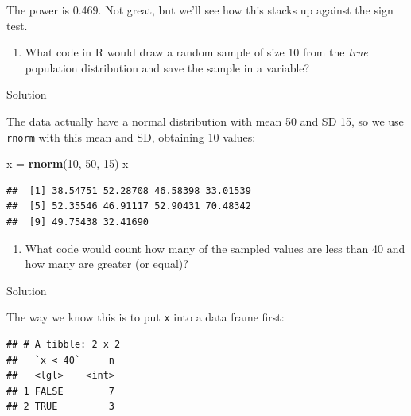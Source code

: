 \documentclass[]{tufte-book}
\newenvironment{Shaded}{}{}
\newcommand{\DecValTok}[1]{\textcolor[rgb]{0.25,0.63,0.44}{#1}}
\newcommand{\KeywordTok}[1]{\textcolor[rgb]{0.00,0.44,0.13}{\textbf{#1}}}
\newcommand{\NormalTok}[1]{#1}
\newcommand{\OperatorTok}[1]{\textcolor[rgb]{0.40,0.40,0.40}{#1}}
\newcommand{\StringTok}[1]{\textcolor[rgb]{0.25,0.44,0.63}{#1}}
\providecommand{\tightlist}{%
  \setlength{\itemsep}{0pt}\setlength{\parskip}{0pt}}
\theoremstyle{definition}
\theoremstyle{definition}
\theoremstyle{definition}
\theoremstyle{remark}
\begin{document}
The power is 0.469. Not great, but we'll see how this stacks up against
the sign test.

\begin{enumerate}
\def\labelenumi{(\alph{enumi})}
\setcounter{enumi}{1}
\tightlist
\item
  What code in R would draw a random sample of size 10 from the
  \emph{true} population distribution and save the sample in a variable?
\end{enumerate}

Solution

The data actually have a normal distribution with mean 50 and SD 15, so
we use \texttt{rnorm} with this mean and SD, obtaining 10 values:

\begin{Shaded}
\begin{Highlighting}[]
\NormalTok{x =}\StringTok{ }\KeywordTok{rnorm}\NormalTok{(}\DecValTok{10}\NormalTok{, }\DecValTok{50}\NormalTok{, }\DecValTok{15}\NormalTok{)}
\NormalTok{x}
\end{Highlighting}
\end{Shaded}

\begin{verbatim}
##  [1] 38.54751 52.28708 46.58398 33.01539
##  [5] 52.35546 46.91117 52.90431 70.48342
##  [9] 49.75438 32.41690
\end{verbatim}

\begin{enumerate}
\def\labelenumi{(\alph{enumi})}
\setcounter{enumi}{2}
\tightlist
\item
  What code would count how many of the sampled values are less than 40
  and how many are greater (or equal)?
\end{enumerate}

Solution

The way we know this is to put \texttt{x} into a data frame first:

\begin{Shaded}
\end{Shaded}

\begin{verbatim}
## # A tibble: 2 x 2
##   `x < 40`     n
##   <lgl>    <int>
## 1 FALSE        7
## 2 TRUE         3
\end{verbatim}
\end{document}
